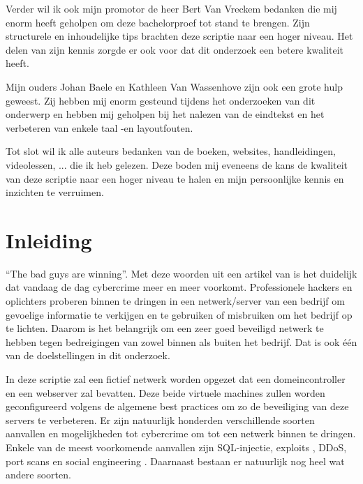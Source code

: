 \documentclass[pdftex,a4paper,12pt]{report}
\begin{document}
Verder wil ik ook mijn promotor de heer Bert Van Vreckem bedanken die mij enorm heeft geholpen om deze bachelorproef tot stand te brengen. Zijn structurele en inhoudelijke tips brachten deze scriptie naar een hoger niveau. Het delen van zijn kennis zorgde er ook voor dat dit onderzoek een betere kwaliteit heeft. \newline

Mijn ouders Johan Baele en Kathleen Van Wassenhove zijn ook een grote hulp geweest. Zij hebben mij enorm gesteund tijdens het onderzoeken van dit onderwerp en hebben mij geholpen bij het nalezen van de eindtekst en het verbeteren van enkele taal -en layoutfouten. \newline

Tot slot wil ik alle auteurs bedanken van de boeken, websites, handleidingen, videolessen, ... die ik heb gelezen. Deze boden mij eveneens de kans de kwaliteit van deze scriptie naar een hoger niveau te halen en mijn persoonlijke kennis en inzichten te verruimen.


\tableofcontents



\chapter{Inleiding}
\label{ch:inleiding}
"`The bad guys are winning"'. Met deze woorden uit een artikel van \cite{Wiener-Bronner2014} is het duidelijk dat vandaag de dag cybercrime meer en meer voorkomt. Professionele hackers en oplichters proberen binnen te dringen in een netwerk/server van een bedrijf om gevoelige informatie te verkijgen en te gebruiken of misbruiken om het bedrijf op te lichten. Daarom is het belangrijk om een zeer goed beveiligd netwerk te hebben tegen bedreigingen van zowel binnen als buiten het bedrijf. Dat is ook één van de doelstellingen in dit onderzoek. \newline

In deze scriptie zal een fictief netwerk worden opgezet dat een domeincontroller en een webserver zal bevatten. Deze beide virtuele machines zullen worden geconfigureerd volgens de algemene best practices om zo de beveiliging van deze servers te verbeteren. Er zijn natuurlijk honderden verschillende soorten aanvallen en mogelijkheden tot cybercrime om tot een netwerk binnen te dringen. Enkele van de meest voorkomende aanvallen zijn SQL-injectie, exploits \citep{Siddharth2006}, DDoS, port scans en social engineering \citep{Gibson2011}. Daarnaast bestaan er natuurlijk nog heel wat andere soorten.
\end{document}
